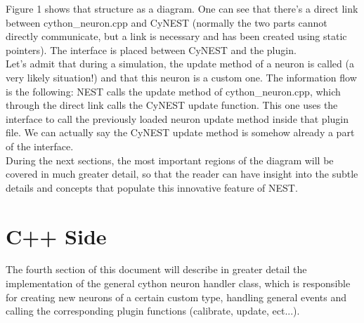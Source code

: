 \documentclass{article}
\begin{document}
Figure 1 shows that structure as a diagram. One can see that there's a direct link between cython\_neuron.cpp and CyNEST (normally the two parts cannot directly communicate, but a link is necessary and has been created using static pointers). The interface is placed between CyNEST and the plugin. \\
Let's admit that during a simulation, the update method of a neuron is called (a very likely situation!) and that this neuron is a custom one. The information flow is the following: NEST calls the update method of cython\_neuron.cpp, which through the direct link calls the CyNEST update function. This one uses the interface to call the previously loaded neuron update method inside that plugin file. We can actually say the CyNEST update method is somehow already a part of the interface.\\
During the next sections, the most important regions of the diagram will be covered in much greater detail, so that the reader can have insight into the subtle details and concepts that populate this innovative feature of NEST.

\section{C++ Side}
The fourth section of this document will describe in greater detail the implementation of the general cython neuron handler class, which is responsible for creating new neurons of a certain custom type, handling general events and calling the corresponding plugin functions (calibrate, update, ect...).
\end{document}
